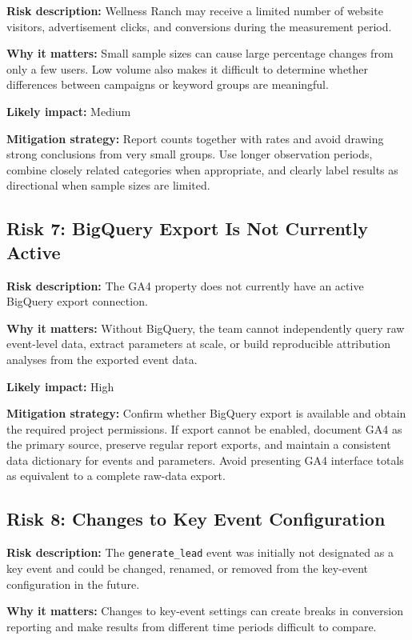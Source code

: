 \documentclass[
  letterpaper,
  DIV=11,
  numbers=noendperiod]{scrartcl}
\begin{document}
\textbf{Risk description:} Wellness Ranch may receive a limited number
of website visitors, advertisement clicks, and conversions during the
measurement period.

\textbf{Why it matters:} Small sample sizes can cause large percentage
changes from only a few users. Low volume also makes it difficult to
determine whether differences between campaigns or keyword groups are
meaningful.

\textbf{Likely impact:} Medium

\textbf{Mitigation strategy:} Report counts together with rates and
avoid drawing strong conclusions from very small groups. Use longer
observation periods, combine closely related categories when
appropriate, and clearly label results as directional when sample sizes
are limited.

\subsection{Risk 7: BigQuery Export Is Not Currently
Active}\label{risk-7-bigquery-export-is-not-currently-active}

\textbf{Risk description:} The GA4 property does not currently have an
active BigQuery export connection.

\textbf{Why it matters:} Without BigQuery, the team cannot independently
query raw event-level data, extract parameters at scale, or build
reproducible attribution analyses from the exported event data.

\textbf{Likely impact:} High

\textbf{Mitigation strategy:} Confirm whether BigQuery export is
available and obtain the required project permissions. If export cannot
be enabled, document GA4 as the primary source, preserve regular report
exports, and maintain a consistent data dictionary for events and
parameters. Avoid presenting GA4 interface totals as equivalent to a
complete raw-data export.

\subsection{Risk 8: Changes to Key Event
Configuration}\label{risk-8-changes-to-key-event-configuration}

\textbf{Risk description:} The \texttt{generate\_lead} event was
initially not designated as a key event and could be changed, renamed,
or removed from the key-event configuration in the future.

\textbf{Why it matters:} Changes to key-event settings can create breaks
in conversion reporting and make results from different time periods
difficult to compare.
\end{document}
